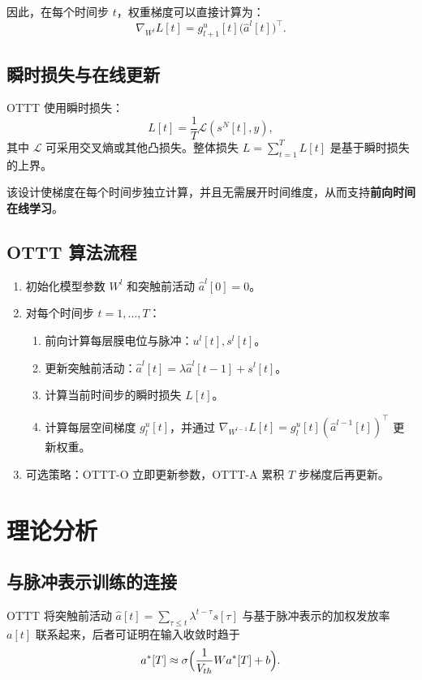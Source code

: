 \documentclass[journal,12pt,onecolumn]{IEEEtran}
\begin{document}
因此，在每个时间步 $t$，权重梯度可以直接计算为：
\begin{equation}
  \nabla_{W^l} L[t] = g^{u}_{l+1}[t] \bigl(\hat a^l[t]\bigr)^\top.
\end{equation}

\subsection{瞬时损失与在线更新}
OTTT 使用瞬时损失：
\begin{equation}
  L[t] = \frac{1}{T} \mathcal{L}(s^N[t], y),
\end{equation}
其中 $\mathcal{L}$ 可采用交叉熵或其他凸损失。整体损失 $L = \sum_{t=1}^T L[t]$ 是基于瞬时损失的上界。

该设计使梯度在每个时间步独立计算，并且无需展开时间维度，从而支持\textbf{前向时间在线学习}。

\subsection{OTTT 算法流程}
\begin{enumerate}[leftmargin=*]
  \item 初始化模型参数 $W^l$ 和突触前活动 $\hat a^l[0] = 0$。
  \item 对每个时间步 $t=1,\dots,T$：
    \begin{enumerate}
      \item 前向计算每层膜电位与脉冲：$u^{l}[t], s^{l}[t]$。
      \item 更新突触前活动：$\hat a^{l}[t] = \lambda \hat a^{l}[t-1] + s^{l}[t]$。
      \item 计算当前时间步的瞬时损失 $L[t]$。
      \item 计算每层空间梯度 $g^{u}_{l}[t]$，并通过 $\nabla_{W^{l-1}}L[t] = g^{u}_{l}[t] (\hat a^{l-1}[t])^{\top}$ 更新权重。
    \end{enumerate}
  \item 可选策略：OTTT-O 立即更新参数，OTTT-A 累积 $T$ 步梯度后再更新。
\end{enumerate}

\section{理论分析}
\subsection{与脉冲表示训练的连接}
OTTT 将突触前活动 $\hat a[t] = \sum_{\tau\le t} \lambda^{t-\tau} s[\tau]$ 与基于脉冲表示的加权发放率 $a[t]$ 联系起来，后者可证明在输入收敛时趋于
\begin{equation}
  a^*[T] \approx \sigma\Bigl( \frac{1}{V_{th}} W a^*[T] + b \Bigr).
\end{equation}
\end{document}
